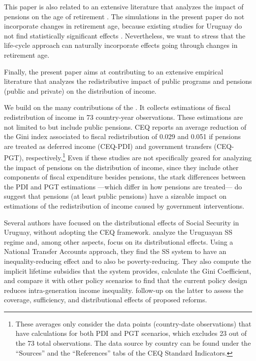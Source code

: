 \documentclass{article}
\begin{document}
This paper is also related to an extensive literature that analyzes the impact of pensions  on the age of retirement \parencite[see, among many others,][]{Gruber1999a, Gruber2004, Jimenez2007}. The simulations in the present paper do not incorporate changes in retirement age, because existing studies for Uruguay do not find statistically significant effects \parencite{Forteza2015b, Alvarez2012, Alvarez2010}. Nevertheless, we want to stress that the life-cycle approach can naturally incorporate effects going through changes in retirement age.    

Finally, the present paper aims at contributing to an extensive empirical literature that analyzes the redistributive impact of public programs and pensions (public and private) on the distribution of income. 

We build on the many contributions of the \textcite{CEQ2024}. It collects estimations of fiscal redistribution of income in 73 country-year observations. These estimations are not limited to but include public pensions. CEQ reports an average reduction of the Gini index associated to fiscal redistribution of 0.029 and 0.051 if pensions are treated as deferred income (CEQ-PDI) and government transfers (CEQ-PGT), respectively.\footnote{These averages only consider the data points (country-date observations) that have calculations for both PDI and PGT scenarios, which excludes 23 out of the 73 total observations. The data source by country can be found under the “Sources” and the “References” tabs of the CEQ Standard Indicators.} Even if these studies are not specifically geared for analyzing the impact of pensions on the distribution of income, since they include other components of fiscal expenditure besides pensions, the stark differences between the PDI and PGT estimations ---which differ in how pensions are treated--- do suggest that pensions (at least public pensions) have a sizeable impact on estimations of the redistribution of income caused by government interventions. 

Several authors have focused on the distributional effects of Social Security in Uruguay, without adopting the CEQ framework. \textcite{zunino2021impactos} analyze the Uruguayan SS regime and, among other aspects, focus on its distributional effects. Using a National Transfer Accounts approach, they find the SS system to have an inequality-reducing effect and to also be poverty-reducing. They also compute the implicit lifetime subsidies that the system provides, calculate the Gini Coefficient, and compare it with other policy scenarios to find that the current policy design reduces intra-generation income inequality. \textcite{zunino2022proyectoSS} follow-up on the latter to assess the coverage, sufficiency, and distributional effects of proposed reforms.
\end{document}
